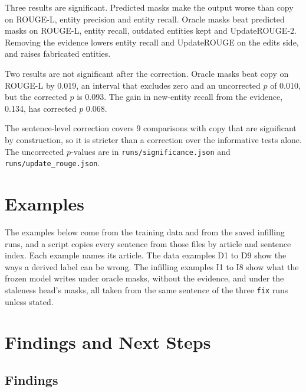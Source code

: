 \documentclass[]{paper}
\begin{document}
Three results are significant. Predicted masks make the output worse than copy on ROUGE-L, entity precision and entity recall. Oracle masks beat predicted masks on ROUGE-L, entity recall, outdated entities kept and UpdateROUGE-2. Removing the evidence lowers entity recall and UpdateROUGE on the edits side, and raises fabricated entities.

Two results are not significant after the correction. Oracle masks beat copy on ROUGE-L by 0.019, an interval that excludes zero and an uncorrected $p$ of 0.010, but the corrected $p$ is 0.093. The gain in new-entity recall from the evidence, 0.134, has corrected $p$ 0.068.

The sentence-level correction covers 9 comparisons with copy that are significant by construction, so it is stricter than a correction over the informative tests alone. The uncorrected $p$-values are in \texttt{runs/significance.json} and \texttt{runs/update\_rouge.json}.

\section{Examples}
\label{sec:examples}

The examples below come from the training data and from the saved infilling runs, and a script copies every sentence from those files by article and sentence index. Each example names its article. The data examples D1 to D9 show the ways a derived label can be wrong. The infilling examples I1 to I8 show what the frozen model writes under oracle masks, without the evidence, and under the staleness head's masks, all taken from the same sentence of the three \texttt{fix} runs unless stated.



\section{Findings and Next Steps}
\label{sec:findings}

\subsection{Findings}
\end{document}
